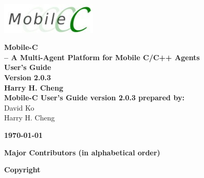 \documentclass[11pt]{report}
\begin{document}
\thispagestyle{empty}
\begin{center}
\includegraphics[width=1.8in]{figure/mobilec_logo.png}


\vspace{0.5in}
{\Huge\sf\bf Mobile-C} \\
\vspace{0.1in}
{\LARGE\sf\bf -- A Multi-Agent Platform for Mobile C/C++ Agents} \\
\vspace{0.4in}
{\LARGE\sf\bf User's Guide} \\
\vspace{0.4in}
{\LARGE\sf\bf Version 2.0.3} \\
\vspace{1.0in}
{\Large\sf\bf Harry H. Cheng} \\
\vspace{1.0in}
{\large\sf\bf Mobile-C User's Guide version 2.0.3 prepared by:} \\
\vspace{0.2in}
David Ko\\
Harry H. Cheng
\vspace{1in}

\vspace{2.0in}
{\large\sf\bf\today}
\end{center}

\pagebreak
\noindent
{\LARGE\sf\bf Major Contributors (in alphabetical order)} \\
{\small

}
\pagebreak


\thispagestyle{empty}
\noindent
{\Large\bf Copyright}\\


\pagebreak
\end{document}
